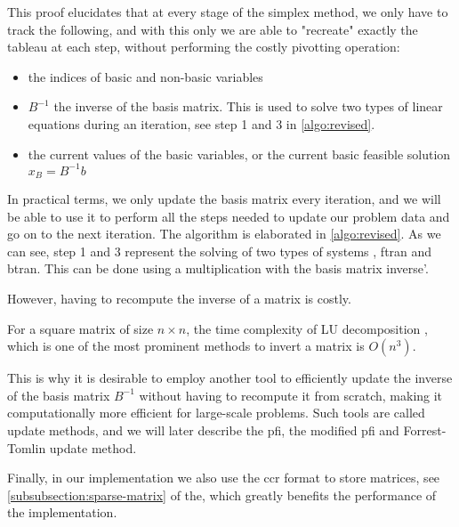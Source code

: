 This proof elucidates that at every stage of the simplex method, we only have to
track the following, and with this only we are able to "recreate" exactly the tableau at
each step, without performing the costly pivotting operation:
\begin{itemize}
    \item the indices of basic and non-basic variables
    \item $B^{-1}$ the inverse of the basis matrix. This is used to solve two types of linear equations
          during an iteration, see step 1 and 3 in \ref{algo:revised}.
    \item the current values of the basic variables, or the current basic feasible solution $x_B = B^{-1}b$
\end{itemize}
In practical terms, we only update the basis matrix every iteration, and we will be able to use it to
perform all the steps needed to update our problem data and go on to the next
iteration.
The algorithm is elaborated in \ref{algo:revised}. As we can see, step 1 and 3 represent the solving of
two types of systems , \gls{ftran} and \gls{btran}. This can be done using a multiplication with
the basis matrix inverse'.

However, having to recompute the inverse of a matrix is costly.

For a square matrix of size \(n \times n\), the time complexity of LU decomposition
\parencite{golub2013matrix},
which is one of the
most prominent methods to invert a matrix is $O(n^3) $.

This is why it is desirable to employ another tool to efficiently
update the inverse of the basis matrix $B^{-1}$
without having to recompute it from scratch,
making it computationally more efficient for large-scale problems. Such tools are called update methods,
and we will later describe the \gls{pfi}, the modified \gls{pfi} and Forrest-Tomlin update method.

Finally, in our implementation we also use the \gls{ccr} format to store matrices,
see \ref{subsubsection:sparse-matrix} of the,
which greatly benefits the performance of the implementation.

